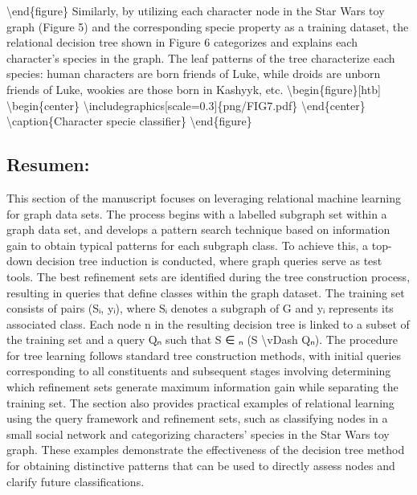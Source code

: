 \documentclass{article}%
\begin{document}
\newline%
\textbackslash{}end\{figure\}\newline%
\newline%
Similarly, by utilizing each character node in the Star Wars toy graph (Figure 5) and the corresponding specie property as a training dataset, the relational decision tree shown in Figure 6 categorizes and explains each character's species in the graph. The leaf patterns of the tree characterize each species: human characters are born friends of Luke, while droids are unborn friends of Luke, wookies are those born in Kashyyk, etc.\newline%
\newline%
\textbackslash{}begin\{figure\}{[}htb{]}\newline%
\textbackslash{}begin\{center\}\newline%
\textbackslash{}includegraphics{[}scale=0.3{]}\{png/FIG7.pdf\}\newline%
\textbackslash{}end\{center\}\newline%
\textbackslash{}caption\{Character specie classifier\}\newline%
\newline%
\textbackslash{}end\{figure\}

%
\subsection{Resumen:}%
\label{subsec:Resumen}%
This section of the manuscript focuses on leveraging relational machine learning for graph data sets. The process begins with a labelled subgraph set within a graph data set, and develops a pattern search technique based on information gain to obtain typical patterns for each subgraph class. To achieve this, a top{-}down decision tree induction is conducted, where graph queries serve as test tools. The best refinement sets are identified during the tree construction process, resulting in queries that define classes within the graph dataset.\newline%
\newline%
The training set consists of pairs (Sᵢ, yᵢ), where Sᵢ denotes a subgraph of G and yᵢ represents its associated class. Each node n in the resulting decision tree is linked to a subset of the training set and a query Qₙ such that S ∈ ₙ (S \textbackslash{}vDash Qₙ). The procedure for tree learning follows standard tree construction methods, with initial queries corresponding to all constituents and subsequent stages involving determining which refinement sets generate maximum information gain while separating the training set.\newline%
\newline%
The section also provides practical examples of relational learning using the query framework and refinement sets, such as classifying nodes in a small social network and categorizing characters' species in the Star Wars toy graph. These examples demonstrate the effectiveness of the decision tree method for obtaining distinctive patterns that can be used to directly assess nodes and clarify future classifications.
\end{document}
